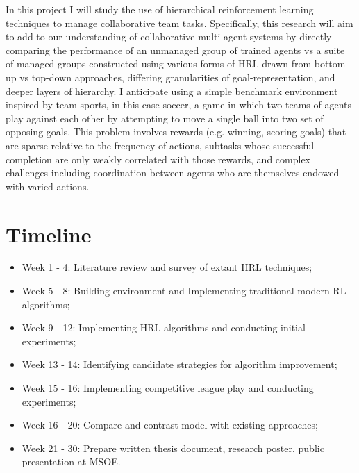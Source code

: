 \documentclass[12pt]{article}
\begin{document}
In this project I will study the use of hierarchical reinforcement learning techniques to manage collaborative team tasks.  Specifically, this research will aim to add to our understanding of collaborative multi-agent systems by directly comparing the performance of an unmanaged group of trained agents vs a suite of managed groups constructed using various forms of HRL drawn from bottom-up vs top-down approaches, differing granularities of goal-representation, and deeper layers of hierarchy.  I anticipate using a simple benchmark environment inspired by team sports, in this case soccer, a game in which two teams of agents play against each other by attempting to move a single ball into two set of opposing goals.  This problem involves rewards (e.g. winning, scoring goals) that are sparse relative to the frequency of actions, subtasks whose successful completion are only weakly correlated with those rewards, and complex challenges including coordination between agents who are themselves endowed with varied actions.

\section{Timeline}

\begin{itemize}
    \item Week 1 - 4: Literature review and survey of extant HRL techniques;
    \item Week 5 - 8: Building environment and Implementing traditional modern RL algorithms;
    \item Week 9 - 12: Implementing HRL algorithms and conducting initial experiments;
    \item Week 13 - 14: Identifying candidate strategies for algorithm improvement;
    \item Week 15 - 16:  Implementing competitive league play and conducting experiments;
    \item Week 16 - 20: Compare and contrast model with existing approaches;
    \item Week 21 - 30: Prepare written thesis document, research poster, public presentation at MSOE.
\end{itemize}
\end{document}
